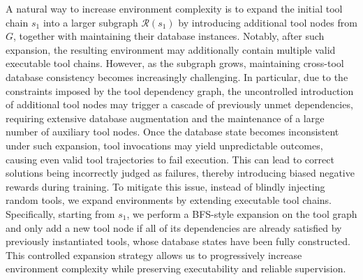 \documentclass{article}
\begin{document}
A natural way to increase environment complexity is to expand the initial tool chain $s_1$ into a larger subgraph $\mathcal{R}(s_1)$ by introducing additional tool nodes from $G$, together with maintaining their database instances.
Notably, after such expansion, the resulting environment may additionally contain multiple valid executable tool chains.
However, as the subgraph grows, maintaining cross-tool database consistency becomes increasingly challenging.
In particular, due to the constraints imposed by the tool dependency graph, the uncontrolled introduction of additional tool nodes may trigger a cascade of previously unmet dependencies, requiring extensive database augmentation and the maintenance of a large number of auxiliary tool nodes.
Once the database state becomes inconsistent under such expansion, tool invocations may yield unpredictable outcomes, causing even valid tool trajectories to fail execution.
This can lead to correct solutions being incorrectly judged as failures, thereby introducing biased negative rewards during training.
To mitigate this issue, instead of blindly injecting random tools, we expand environments by extending executable tool chains.
Specifically, starting from $s_1$, we perform a BFS-style expansion on the tool graph and only add a new tool node if all of its dependencies are already satisfied by previously instantiated tools, whose database states have been fully constructed.
This controlled expansion strategy allows us to progressively increase environment complexity while preserving executability and reliable supervision.
\end{document}
